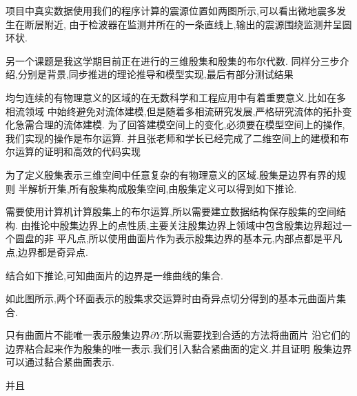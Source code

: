 \documentclass[UTF8]{ctexbeamer}	%
\theoremstyle{plain}
\theoremstyle{definition}
\theoremstyle{remark}
\numberwithin{equation}{section}
\begin{document}
\begin{frame}
    项目中真实数据使用我们的程序计算的震源位置如两图所示,可以看出微地震多发生在断层附近,
    由于检波器在监测井所在的一条直线上,输出的震源围绕监测井呈圆环状.
\end{frame}

\begin{frame}
    另一个课题是我这学期目前正在进行的三维殷集和殷集的布尔代数.
    同样分三步介绍,分别是背景,同步推进的理论推导和模型实现,最后有部分测试结果
\end{frame}

\begin{frame}
    均匀连续的有物理意义的区域的在无数科学和工程应用中有着重要意义.比如在多相流领域
    中始终避免对流体建模,但是随着多相流研究发展,严格研究流体的拓扑变化急需合理的流体建模.
    为了回答建模空间上的变化,必须要在模型空间上的操作,我们实现的操作是布尔运算.
    并且张老师和学长已经完成了二维空间上的建模和布尔运算的证明和高效的代码实现
\end{frame}

\begin{frame}
    为了定义殷集表示三维空间中任意复杂的有物理意义的区域.殷集是边界有界的规则
    半解析开集,所有殷集构成殷集空间,由殷集定义可以得到如下推论.
\end{frame}

\begin{frame}
    需要使用计算机计算殷集上的布尔运算,所以需要建立数据结构保存殷集的空间结构.
    由推论中殷集边界上的点性质,主要关注殷集边界上领域中包含殷集边界超过一个圆盘的非
    平凡点,所以使用曲面片作为表示殷集边界的基本元,内部点都是平凡点,边界都是奇异点.

    结合如下推论,可知曲面片的边界是一维曲线的集合.

\end{frame}

\begin{frame}
    如此图所示,两个环面表示的殷集求交运算时由奇异点切分得到的基本元曲面片集合.
\end{frame}

\begin{frame}
    只有曲面片不能唯一表示殷集边界$\partial Y$.所以需要找到合适的方法将曲面片
    沿它们的边界粘合起来作为殷集的唯一表示.我们引入黏合紧曲面的定义.并且证明
    殷集边界可以通过黏合紧曲面表示.
\end{frame}

\begin{frame}
    并且
\end{frame}



\end{document}
